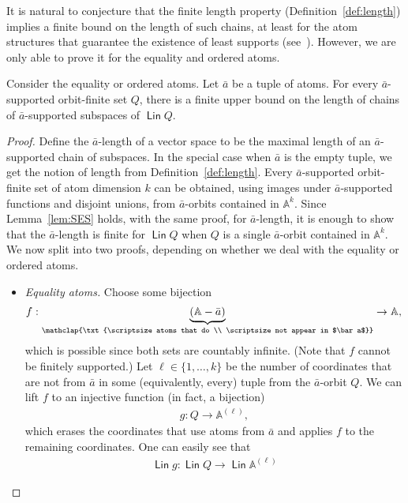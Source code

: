 \documentclass[10pt,a4paper]{amsart}
\numberwithin{equation}{section}
\newcommand{\set}[1]{\{#1\}}
\newcommand{\myunderbrace}[2]{\underbrace{#1}_{\mathclap{\txt{\scriptsize #2}}}}
\newcommand{\atoms}{\mathbb A}
\DeclareMathOperator{\lin}{\mathsf{Lin}}
\begin{document}
It is natural to conjecture that the finite length property (Definition~\ref{def:length}) implies a finite bound on the length of such chains, at least for the atom structures that guarantee the existence of least supports (see~\cite[Section 9]{BKL14}). However, we are only able to prove it for the equality and ordered atoms.

\begin{theorem}\label{cor:finsup-length}
	Consider the equality or ordered atoms. Let $\bar a$ be a tuple of atoms.  For every $\bar a$-supported orbit-finite set $Q$, there is a finite upper bound on the length of chains of $\bar a$-supported subspaces of $\lin Q$.
\end{theorem}
\begin{proof}
	Define the $\bar a$-length of a vector space to be the maximal length of an $\bar a$-supported chain of subspaces. In the special case when $\bar a$ is the empty tuple, we get the notion of length from Definition~\ref{def:length}. 
	Every $\bar a$-supported orbit-finite set of atom dimension $k$ can be obtained, using images under $\bar a$-supported functions and disjoint unions, from $\bar a$-orbits contained in $\atoms^k$. Since 
	 Lemma~\ref{lem:SES} holds, with the same proof,  for $\bar a$-length, it is enough to show that the $\bar a$-length is finite for $\lin Q$ when $Q$ is a single $\bar a$-orbit contained in $\atoms^k$. We now split into two proofs, depending on whether we deal with the equality or ordered atoms. 
	 \begin{itemize}
	 \item \emph{Equality atoms.} Choose some bijection 
	 \begin{align*}
	 f : \myunderbrace{(\atoms - \bar a)}{atoms that do  \\
	 \scriptsize not appear in $\bar a$} \to \atoms,
	 \end{align*}
	 which is possible since both sets are countably infinite. (Note that $f$ cannot be finitely supported.) Let $\ell \in \set{1,\ldots,k}$ be the number of coordinates that are not from $\bar a$ in some (equivalently, every) tuple from the $\bar a$-orbit $Q$.  We can lift $f$ to an injective function (in fact, a bijection) 
	 \begin{align*}
	 g : Q \to \atoms^{(\ell
	 )},
	 \end{align*}
	 which erases the coordinates that use atoms from $\bar a$ and applies $f$ to the remaining coordinates. One can easily see that 
	 \begin{align*}
	 \lin g : \lin Q \to \lin \atoms^{(\ell)}

\end{align*}
\end{itemize}
\end{proof}
\end{document}
